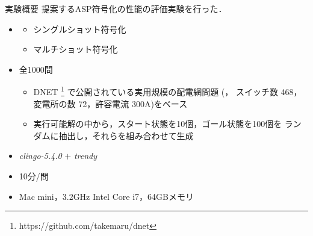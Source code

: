 \documentclass[dvipdfmx,11pt]{beamer}
\begin{document}
\begin{frame}{実験概要}
  \renewcommand{\thefootnote}{\fnsymbol{footnote}}
  \setcounter{footnote}{1}
 提案するASP符号化の性能の評価実験を行った．
  \vfill
  \begin{itemize}
  \item {}
    \begin{itemize}
    \item シングルショット符号化
    \item マルチショット符号化
    \end{itemize}
  \item {} 全1000問
    \begin{itemize}
    \item DNET \footnote{https://github.com/takemaru/dnet}
      で公開されている実用規模の配電網問題 (，
      スイッチ数 468，変電所の数 72，許容電流 300A)をベース
    \item 実行可能解の中から，スタート状態を10個，ゴール状態を100個を
          ランダムに抽出し，それらを組み合わせて生成
    \end{itemize}
  \item {} \textit{clingo-5.4.0} $+$ \textit{trendy}
   \item {} 10分/問
  \item {} Mac mini，3.2GHz Intel Core i7，64GBメモリ
  \end{itemize}
\end{frame}
\end{document}
